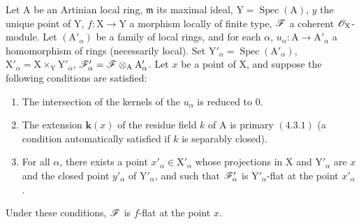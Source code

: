 \begin{proposition}[11.4.11]
\label{IV.11.4.11}
Let $\mathrm{A}$ be an Artinian local ring, $\mathfrak{m}$ its maximal ideal,
$\mathrm{Y}=\operatorname{Spec}(\mathrm{A})$, $y$ the unique point of $\mathrm{Y}$, $f:\mathrm{X}\to\mathrm{Y}$ a morphism locally of finite type, $\mathscr{F}$ a
coherent $\mathscr{O}_\mathrm{X}$-module. Let $(\mathrm{A}'_\alpha)$ be a family of local rings, and for each $\alpha$, $u_\alpha:\mathrm{A}\to\mathrm{A}'_\alpha$
a homomorphism of rings (necessarily local). Set $\mathrm{Y}'_\alpha=\operatorname{Spec}(\mathrm{A}'_\alpha)$, $\mathrm{X}'_\alpha=\mathrm{X}\times_\mathrm{Y}\mathrm{Y}'_\alpha$,
$\mathscr{F}'_\alpha=\mathscr{F}\otimes_\mathrm{A}\mathrm{A}'_\alpha$. Let $x$ be a point
of $\mathrm{X}$, and suppose the following conditions are satisfied:
\begin{enumerate}[label=\textup{(\roman*)}]
  \item The intersection of the kernels of the $u_\alpha$ is reduced to $0$.
  \item The extension $\boldsymbol{k}(x)$ of the residue field $k$ of $\mathrm{A}$ is primary $(4.3.1)$ (a condition automatically
  satisfied if $k$ is separably closed).
\end{enumerate}
\begin{enumerate}[label=\textup{(\roman*)}]
  \setcounter{enumi}{2}
  \item For all $\alpha$, there exists a point $x'_\alpha\in\mathrm{X}'_\alpha$ whose projections in $\mathrm{X}$ and $\mathrm{Y}'_\alpha$
  are $x$ and the closed point $y'_\alpha$ of $\mathrm{Y}'_\alpha$, and such that $\mathscr{F}'_\alpha$ is $\mathrm{Y}'_\alpha$-flat at the point $x'_\alpha$.
\end{enumerate}

Under these conditions, $\mathscr{F}$ is $f$-flat at the point $x$.
\end{proposition}

